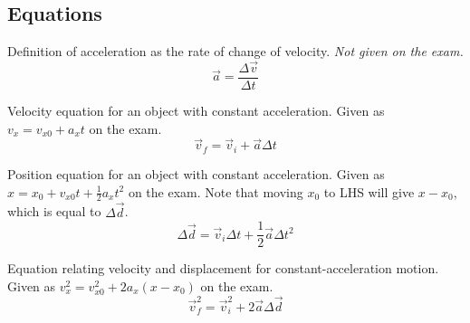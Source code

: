 \documentclass{article}[11pt]
\numberwithin{equation}{section}
\begin{document}
        \subsection*{Equations}
            Definition of acceleration as the rate of change of velocity.
            \emph{Not given on the exam.}
            \begin{equation}
                \vec{a} = \frac{\Delta \vec{v}}{\Delta t}
            \end{equation}

            Velocity equation for an object with constant acceleration.
            Given as $v_x = v_{x0} + a_xt$ on the exam.
            \begin{equation}
                \vec{v}_f = \vec{v}_i + \vec{a}\Delta t
            \end{equation}

            Position equation for an object with constant acceleration.
            Given as $x = x_0 + v_{x0}t + \frac{1}{2}a_xt^2$ on the exam.
            Note that moving $x_0$ to LHS will give $x - x_0$,
            which is equal to $\Delta\vec{d}$.
            \begin{equation}
                \Delta \vec{d} =
                \vec{v}_i\Delta t + \frac{1}{2}\vec{a}\Delta t^2
            \end{equation}

            Equation relating velocity and displacement for
            constant-acceleration motion. Given as
            $v^2_x = v^2_{x0} + 2a_x(x - x_0)$ on the exam.
            \begin{equation}
                \vec{v}^2_f = \vec{v}^2_i + 2\vec{a}\Delta\vec{d}
            \end{equation}
\end{document}
